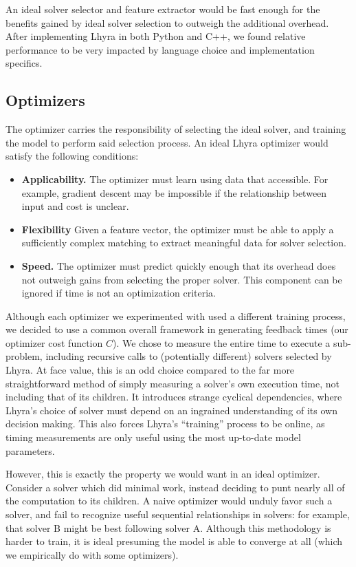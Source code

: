 \documentclass[11pt]{article}
\begin{document}
An ideal solver selector and feature extractor would be fast enough for the benefits gained by ideal solver selection to outweigh the additional overhead. After implementing Lhyra in both Python and C++, we found relative performance to be very impacted by language choice and implementation specifics.

\subsection{Optimizers}

The optimizer carries the responsibility of selecting the ideal solver, and training the model to perform said selection process.  An ideal Lhyra optimizer would satisfy the following conditions:

\begin{itemize}
    \item \textbf{Applicability.} The optimizer must learn using data that accessible. For example, gradient descent may be impossible if the relationship between input and cost is unclear.
    \item \textbf{Flexibility} Given a feature vector, the optimizer must be able to apply a sufficiently complex matching to extract meaningful data for solver selection.
    \item \textbf{Speed.} The optimizer must predict quickly enough that its overhead does not outweigh gains from selecting the proper solver. This component can be ignored if time is not an optimization criteria.
\end{itemize}

Although each optimizer we experimented with used a different training process, we decided to use a common overall framework in generating feedback times (our optimizer cost function $C$).  We chose to measure the entire time to execute a sub-problem, including recursive calls to (potentially different) solvers selected by Lhyra.  At face value, this is an odd choice compared to the far more straightforward method of simply measuring a solver's own execution time, not including that of its children.  It introduces strange cyclical dependencies, where Lhyra's choice of solver must depend on an ingrained understanding of its own decision making.  This also forces Lhyra's ``training'' process to be online, as timing measurements are only useful using the most up-to-date model parameters.

However, this is exactly the property we would want in an ideal optimizer.  Consider a solver which did minimal work, instead deciding to punt nearly all of the computation to its children.  A naive optimizer would unduly favor such a solver, and fail to recognize useful sequential relationships in solvers: for example, that solver B might be best following solver A.  Although this methodology is harder to train, it is ideal presuming the model is able to converge at all (which we empirically do with some optimizers). 
\end{document}
